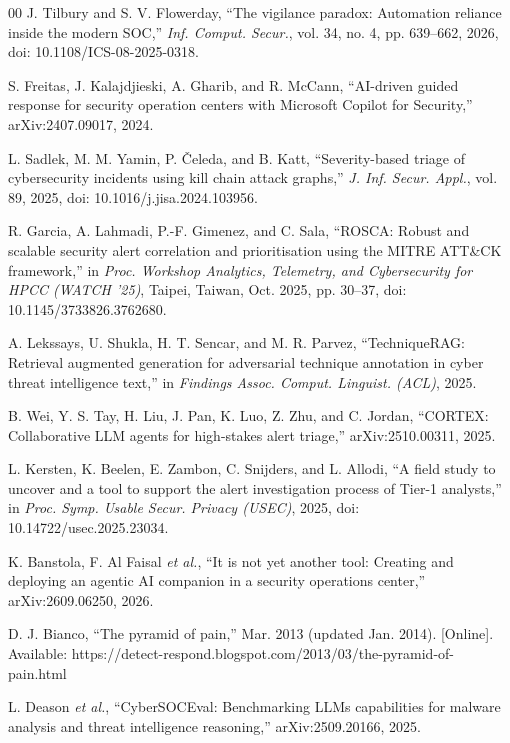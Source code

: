 \documentclass[conference]{IEEEtran}
\begin{document}
\begin{thebibliography}{00}
 J. Tilbury and S. V. Flowerday, ``The vigilance
paradox: Automation reliance inside the modern SOC,'' \emph{Inf.
Comput. Secur.}, vol. 34, no. 4, pp. 639--662, 2026,
doi: 10.1108/ICS-08-2025-0318.

 S. Freitas, J. Kalajdjieski, A. Gharib, and
R. McCann, ``AI-driven guided response for security operation centers
with Microsoft Copilot for Security,'' arXiv:2407.09017, 2024.

 L. Sadlek, M. M. Yamin, P. \v{C}eleda, and
B. Katt, ``Severity-based triage of cybersecurity incidents using kill
chain attack graphs,'' \emph{J. Inf. Secur. Appl.}, vol. 89, 2025,
doi: 10.1016/j.jisa.2024.103956.

 R. Garcia, A. Lahmadi, P.-F. Gimenez, and
C. Sala, ``ROSCA: Robust and scalable security alert correlation and
prioritisation using the MITRE ATT\&CK framework,'' in \emph{Proc.
Workshop Analytics, Telemetry, and Cybersecurity for HPCC (WATCH '25)},
Taipei, Taiwan, Oct. 2025, pp. 30--37, doi: 10.1145/3733826.3762680.

 A. Lekssays, U. Shukla, H. T. Sencar, and
M. R. Parvez, ``TechniqueRAG: Retrieval augmented generation for
adversarial technique annotation in cyber threat intelligence text,''
in \emph{Findings Assoc. Comput. Linguist. (ACL)}, 2025.

 B. Wei, Y. S. Tay, H. Liu, J. Pan, K. Luo,
Z. Zhu, and C. Jordan, ``CORTEX: Collaborative LLM agents for
high-stakes alert triage,'' arXiv:2510.00311, 2025.

 L. Kersten, K. Beelen, E. Zambon, C. Snijders,
and L. Allodi, ``A field study to uncover and a tool to support the
alert investigation process of Tier-1 analysts,'' in \emph{Proc. Symp.
Usable Secur. Privacy (USEC)}, 2025, doi: 10.14722/usec.2025.23034.

 K. Banstola, F. Al Faisal \emph{et al.}, ``It is
not yet another tool: Creating and deploying an agentic AI companion in
a security operations center,'' arXiv:2609.06250, 2026.

 D. J. Bianco, ``The pyramid of pain,'' Mar. 2013
(updated Jan. 2014). [Online]. Available:
https://detect-respond.blogspot.com/2013/03/the-pyramid-of-pain.html

 L. Deason \emph{et al.}, ``CyberSOCEval:
Benchmarking LLMs capabilities for malware analysis and threat
intelligence reasoning,'' arXiv:2509.20166, 2025.


\end{thebibliography}
\end{document}
